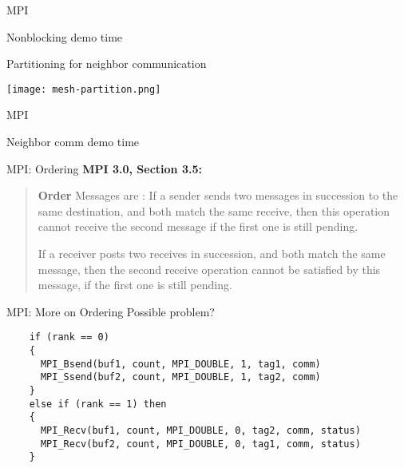 \documentclass[english,compress]{beamer}
\begin{document}
\begin{frame}{MPI}
  \begin{center}
  \Huge Nonblocking demo time
  \end{center}
\end{frame}
\begin{frame}{Partitioning for neighbor communication}
  \begin{center}
    \texttt{[image: mesh-partition.png]}
  \end{center}
  \uncover<+>{}
\end{frame}
\begin{frame}{MPI}
  \begin{center}
  \Huge Neighbor comm demo time
  \end{center}
\end{frame}
\begin{frame}{MPI: Ordering}
  \uncover<+->{}
  \textbf{MPI 3.0, Section 3.5:}
  \begin{quote}
    \upshape
    \textbf{Order} Messages are : If a
    sender sends two messages in succession to the same destination,
    and both match the same receive, then this operation cannot
    receive the second message if the first one is still pending.

    \bigskip
    If a receiver posts two receives in succession,
    and both match the same message, then the second receive operation
    cannot be satisfied
    by this message, if the first one is still pending.
  \end{quote}
\end{frame}
\begin{frame}[fragile]{MPI: More on Ordering}
  Possible problem?
  \begin{lstlisting}
    if (rank == 0)
    {
      MPI_Bsend(buf1, count, MPI_DOUBLE, 1, tag1, comm)
      MPI_Ssend(buf2, count, MPI_DOUBLE, 1, tag2, comm)
    }
    else if (rank == 1) then
    {
      MPI_Recv(buf1, count, MPI_DOUBLE, 0, tag2, comm, status)
      MPI_Recv(buf2, count, MPI_DOUBLE, 0, tag1, comm, status)
    }
  \end{lstlisting}
\end{frame}
\end{document}
